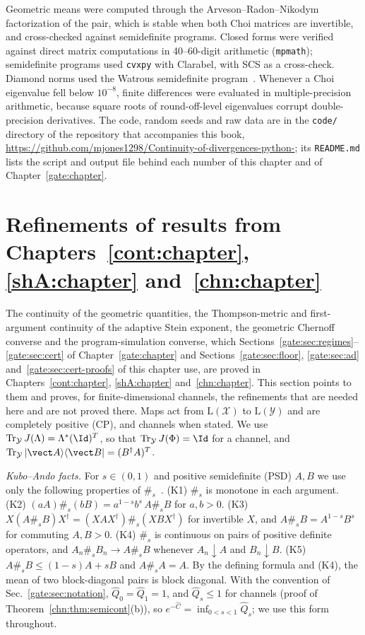 Geometric means were computed through the Arveson--Radon--Nikodym factorization of the pair, which is stable when both Choi matrices are invertible, and cross-checked against semidefinite programs. Closed forms were verified against direct matrix computations in 40--60-digit arithmetic (\texttt{mpmath}); semidefinite programs used \texttt{cvxpy} with Clarabel, with SCS as a cross-check. Diamond norms used the Watrous semidefinite program~\cite{watrous2018theory}. Whenever a Choi eigenvalue fell below $10^{-8}$, finite differences were evaluated in multiple-precision arithmetic, because square roots of round-off-level eigenvalues corrupt double-precision derivatives. The code, random seeds and raw data are in the \texttt{code/} directory of the repository that accompanies this book, \url{https://github.com/mjones1298/Continuity-of-divergences-python-}; its \texttt{README.md} lists the script and output file behind each number of this chapter and of Chapter~\ref{gate:chapter}.

\section{\texorpdfstring{Refinements of results from Chapters~\ref{cont:chapter}, \ref{shA:chapter} and~\ref{chn:chapter}}{Refinements of results from other chapters}}\label{gate:smp:sec}

The continuity of the geometric quantities, the Thompson-metric and first-argument continuity of the adaptive Stein exponent, the geometric Chernoff converse and the program-simulation converse, which Sections~\ref{gate:sec:regimes}--\ref{gate:sec:cert} of Chapter~\ref{gate:chapter} and Sections~\ref{gate:sec:floor}, \ref{gate:sec:ad} and~\ref{gate:sec:cert-proofs} of this chapter use, are proved in Chapters~\ref{cont:chapter}, \ref{shA:chapter} and~\ref{chn:chapter}. This section points to them and proves, for finite-dimensional channels, the refinements that are needed here and are not proved there. Maps act from $\mathrm L(\mathcal X)$ to $\mathrm L(\mathcal Y)$ and are completely positive (CP), and channels when stated. We use $\Tr_{\mathcal Y}J(\Lambda)=\Lambda^*(\Id)^T$, so that $\Tr_{\mathcal Y}J(\Phi)=\Id$ for a channel, and $\Tr_{\mathcal Y}|\vect A\rangle\langle\vect B|=(B^\dagger A)^T$.

\emph{Kubo--Ando facts.} For $s\in(0,1)$ and positive semidefinite (PSD) $A,B$ we use only the following properties of $\#_s$~\cite{KuboAndo1980}. (K1) $\#_s$ is monotone in each argument. (K2) $(aA)\#_s(bB)=a^{1-s}b^s\,A\#_sB$ for $a,b>0$. (K3) $X(A\#_sB)X^\dagger=(XAX^\dagger)\#_s(XBX^\dagger)$ for invertible $X$, and $A\#_sB=A^{1-s}B^s$ for commuting $A,B>0$. (K4) $\#_s$ is continuous on pairs of positive definite operators, and $A_n\#_sB_n\to A\#_sB$ whenever $A_n\downarrow A$ and $B_n\downarrow B$. (K5) $A\#_sB\le(1-s)A+sB$ and $A\#_sA=A$. By the defining formula and (K4), the mean of two block-diagonal pairs is block diagonal. With the convention of Sec.~\ref{gate:sec:notation}, $\hat Q_0=\hat Q_1=1$, and $\hat Q_s\le1$ for channels (proof of Theorem~\ref{chn:thm:semicont}(b)), so $e^{-\hat C}=\inf_{0<s<1}\hat Q_s$; we use this form throughout.

